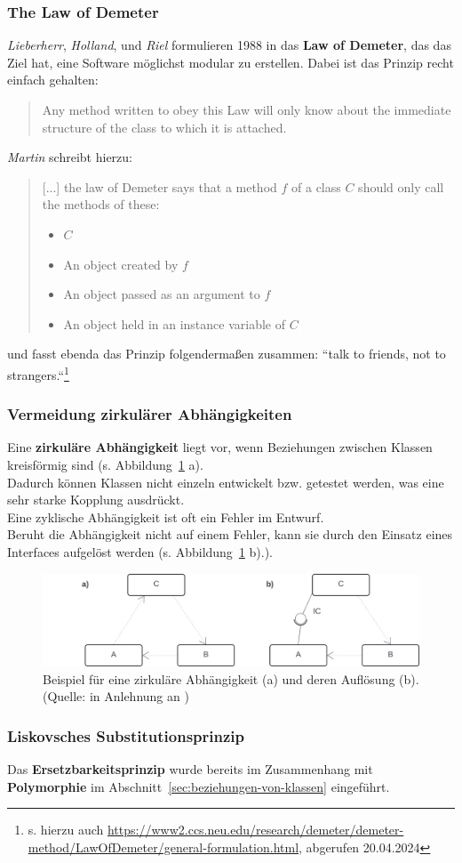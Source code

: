 \subsubsection*{The Law of Demeter}
\textit{Lieberherr}, \textit{Holland}, und \textit{Riel} formulieren 1988 in \cite{LHR88} das \textbf{Law of Demeter}, das das Ziel hat, eine Software möglichst modular zu erstellen.
Dabei ist das Prinzip recht einfach gehalten:

\blockquote[{\cite[325]{LHR88}}]{
    Any method written to obey this Law will only know about the immediate structure of the class to which it is attached.
}

\noindent
\textit{Martin} schreibt hierzu:

\blockquote[{\cite[97 f.]{Mar08}}]{
[...] the law of Demeter says that a method $f$ of a class $C$ should only call the methods of these:
\begin{itemize}
    \item $C$
    \item An object created by $f$
    \item An object passed as an argument to $f$
    \item An object held in an instance variable of $C$
\end{itemize}
}
\noindent
und fasst ebenda das Prinzip folgendermaßen zusammen: ``talk to friends, not to strangers.``\footnote{
s. hierzu auch \url{https://www2.ccs.neu.edu/research/demeter/demeter-method/LawOfDemeter/general-formulation.html}, abgerufen 20.04.2024
}

\subsubsection*{Vermeidung zirkulärer Abhängigkeiten}
Eine \textbf{zirkuläre Abhängigkeit} liegt vor, wenn Beziehungen zwischen Klassen kreisförmig sind (s. Abbildung~\ref{fig:zirkulaer} a).\\
Dadurch können Klassen nicht einzeln entwickelt bzw. getestet werden, was eine sehr starke Kopplung ausdrückt.\\
Eine zyklische Abhängigkeit ist oft ein Fehler im Entwurf.\\
Beruht die Abhängigkeit nicht auf einem Fehler, kann sie durch den Einsatz eines Interfaces aufgelöst werden (s. Abbildung~\ref{fig:zirkulaer} b).).

\begin{figure}
    \centering
    \includegraphics[scale=0.4]{part two/Objektorientierter Entwurf/img/zirkulaer}
    \caption{
        Beispiel für eine zirkuläre Abhängigkeit (a) und deren Auflösung (b).
        (Quelle: in Anlehnung an \cite[76, Abb. 3.19]{Wed09b})
    }
    \label{fig:zirkulaer}
\end{figure}

\subsubsection*{Liskovsches Substitutionsprinzip}
Das \textbf{Ersetzbarkeitsprinzip} wurde bereits im Zusammenhang mit \textbf{Polymorphie} im Abschnitt~\ref{sec:beziehungen-von-klassen} eingeführt.
